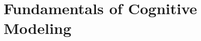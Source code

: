 \documentclass[11pt,a4paper,openany]{book}
\begin{document}
\frontmatter\tableofcontents
\mainmatter
\chapter{Fundamentals of Cognitive Modeling}
\end{document}
